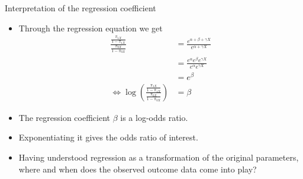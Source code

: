 \documentclass[10pt]{beamer}\usepackage[]{graphicx}\usepackage[]{color}
\begin{document}
\begin{frame}{Interpretation of the regression coefficient}
	\begin{itemize}
		\item Through the regression equation we get
		$$
		\begin{aligned}
		\frac{\frac{\pi_{1 X}}{1-\pi_{1 X}}}{\frac{\pi_{0 X}}{1-\pi_{0 X}}} &=\frac{e^{\alpha+\beta+\gamma X}}{e^{\alpha+\gamma X}} \\
		&=\frac{e^{\alpha} e^{\beta} e^{\gamma X}}{e^{\alpha} e^{\gamma X}} \\
		&=e^{\beta} \\
		\Leftrightarrow \log \left(\frac{\frac{\pi_{1 X}}{1-\pi_{1 X}}}{\frac{\pi_{0 X}}{1-\pi_{0 X}}}\right) &=\beta
		\end{aligned}
		$$
		\item The regression coefficient $\beta$ is a log-odds ratio.
		\item Exponentiating it gives the odds ratio of interest.
		\item Having understood regression as a transformation of the original parameters, where and when does the observed outcome data come into play?
	\end{itemize}
\end{frame}
\end{document}
